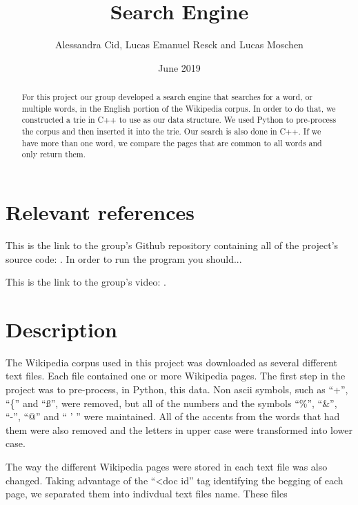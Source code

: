 \documentclass{article}
\title{Search Engine}
\author{Alessandra Cid, Lucas Emanuel Resck  
and Lucas Moschen}
\date{June 2019}
\begin{document}
\maketitle

\begin{abstract}
For this project our group developed a search engine that searches for a word, or multiple words, in the English portion of the Wikipedia corpus. In order to do that, we constructed a trie in C++ to use as our data structure. We used Python to pre-process the corpus and then inserted it into the trie. Our search is also done in C++. If we have more than one word, we compare the pages that are common to all words and only return them. 
\end{abstract}

\section*{Relevant references}
This is the link to the group's Github repository containing all of the project's 
source code: . In order to run the program you should...

This is the link to the group's video: . 

\section*{Description}
The Wikipedia corpus used in this project was downloaded as several different text files. Each file contained one or more Wikipedia pages. The first step in the project was to pre-process, in Python, this data. Non ascii symbols, such as ``+'', ``\{'' and ``ß'', were removed, but all of the numbers and the symbols ``\%'', ``\&'', ``-'', ``@'' and `` ' '' were maintained. All of the accents from the words that had them were also removed and the letters in upper case were transformed into lower case. 

The way the different Wikipedia pages were stored in each text file was also changed. Taking advantage of the ``<doc id'' tag identifying the begging of each page, we separated them into indivdual text files name. These files 
\end{document}
